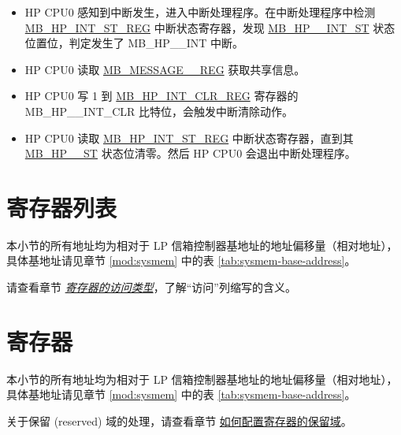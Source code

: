 \documentclass[main\_\_CN.tex]{subfiles}
\begin{document}
\begin{itemize}
\begin{itemize}
        \item HP CPU0 感知到中断发生，进入中断处理程序。在中断处理程序中检测 \hyperref[regdesc:MBHPINTSTREG]{MB\_HP\_INT\_ST\_REG} 中断状态寄存器，发现 \hyperref[fielddesc:MBHP0INTST]{MB\_HP\_\_INT\_ST} 状态位置位，判定发生了 MB\_HP\_\_INT 中断。
        \item HP CPU0 读取 \hyperref[regdesc:MBMESSAGE0REG]{MB\_MESSAGE\_\_REG} 获取共享信息。
        \item HP CPU0 写 1 到 \hyperref[regdesc:MBHPINTCLRREG]{MB\_HP\_INT\_CLR\_REG} 寄存器的 {MB\_HP\_\_INT\_CLR} 比特位，会触发中断清除动作。
        \item HP CPU0 读取 \hyperref[regdesc:MBHPINTSTREG]{MB\_HP\_INT\_ST\_REG} 中断状态寄存器，直到其 \hyperref[fielddesc:MBHP0INTST]{MB\_HP\_\_ST} 状态位清零。然后 HP CPU0 会退出中断处理程序。
    \end{itemize}
\end{itemize}




\hypertarget{lpmailbox-reg-summ}{}
\section{寄存器列表}
\label{sec:lpmailbox-reg-summ}

本小节的所有地址均为相对于 LP 信箱控制器基地址的地址偏移量（相对地址），具体基地址请见章节 \ref{mod:sysmem} \textit{} 中的表 \ref{tab:sysmem-base-address}。

请查看章节 \hyperref[glossary-access-types]{\textit{寄存器的访问类型}}，了解“访问”列缩写的含义。





\newpage
\section{寄存器}

本小节的所有地址均为相对于 LP 信箱控制器基地址的地址偏移量（相对地址），具体基地址请见章节 \ref{mod:sysmem} \textit{} 中的表 \ref{tab:sysmem-base-address}。

关于保留 (reserved) 域的处理，请查看章节 \hyperref[programming-reserved-field]{如何配置寄存器的保留域}。


\end{document}

